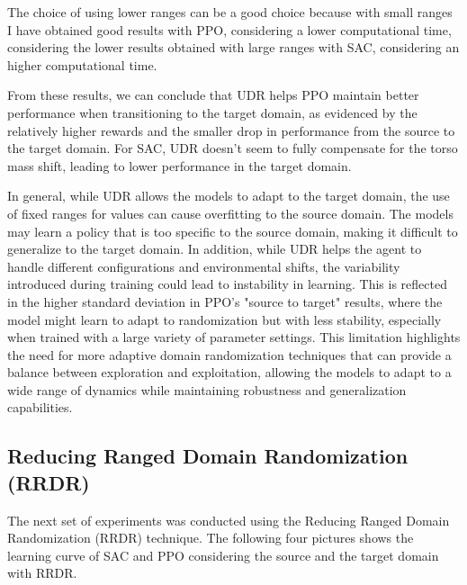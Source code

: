 \documentclass[12pt]{article}
\begin{document}
The choice of using lower ranges can be a good choice because with small ranges I have obtained good results with PPO, considering a lower computational time, considering the lower results obtained with large ranges with SAC, considering an higher computational time.

From these results, we can conclude that UDR helps PPO maintain better performance when transitioning to the target domain, as evidenced by the relatively higher rewards and the smaller drop in performance from the source to the target domain. For SAC, UDR doesn't seem to fully compensate for the torso mass shift, leading to lower performance in the target domain.

In general, while UDR allows the models to adapt to the target domain, the use of fixed ranges for values can cause overfitting to the source domain. The models may learn a policy that is too specific to the source domain, making it difficult to generalize to the target domain. In addition, while UDR helps the agent to handle different configurations and environmental shifts, the variability introduced during training could lead to instability in learning. This is reflected in the higher standard deviation in PPO’s "source to target" results, where the model might learn to adapt to randomization but with less stability, especially when trained with a large variety of parameter settings. This limitation highlights the need for more adaptive domain randomization techniques that can provide a balance between exploration and exploitation, allowing the models to adapt to a wide range of dynamics while maintaining robustness and generalization capabilities.

\subsection{Reducing Ranged Domain Randomization (RRDR)}

The next set of experiments was conducted using the Reducing Ranged Domain Randomization (RRDR) technique. The following four pictures shows the learning curve of SAC and PPO considering the source and the target domain with RRDR.
\end{document}
